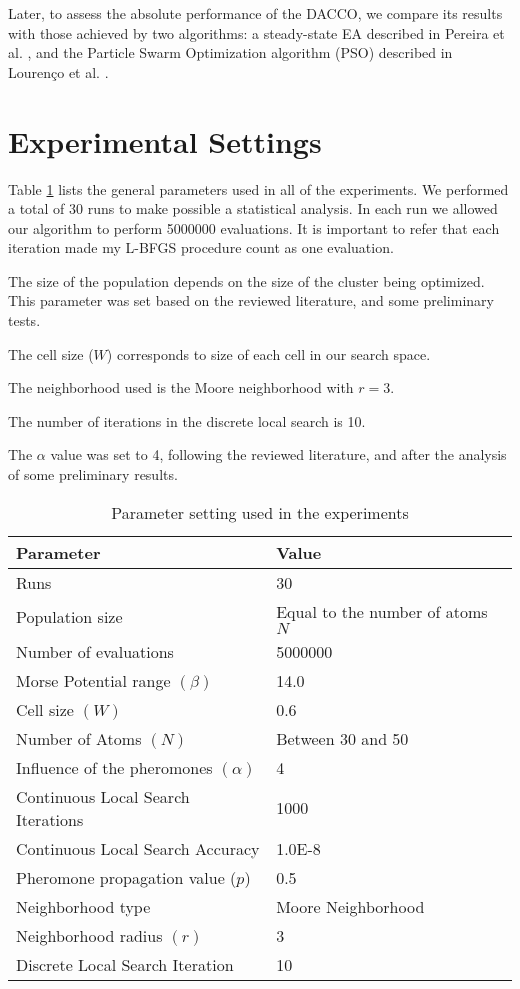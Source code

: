 	Later, to assess the absolute performance of the DACCO, we compare its results with those achieved by two algorithms: a steady-state EA described in Pereira et al. \cite{xico09}, and the Particle Swarm Optimization algorithm (PSO) described in Lourenço et al. \cite{lourenco11}.
	
\section{Experimental Settings}
\label{sec:experimental_setting}

Table \ref{tab:general_settings} lists the general parameters used in all of the experiments. We performed a total of 30 runs to make possible a statistical analysis. In each run we allowed our algorithm to perform 5000000 evaluations. It is important to refer that each iteration made my L-BFGS procedure count as one evaluation. 

The size of the population depends on the size of the cluster being optimized. This parameter was set based on the reviewed literature, and some preliminary tests. 

The cell size ($W$) corresponds to size of each cell in our search space. 

The neighborhood used is the Moore neighborhood with $r = 3$. 

The number of iterations in the discrete local search is 10.

The $\alpha$ value was set to 4, following the reviewed literature, and after the analysis of some preliminary results.

\begin{table}[!htbp]
	\begin{center}
		\begin{tabular}{| l | p{8cm} |}
			\hline
			\textbf{Parameter} & \textbf{Value} \\ \hline
			Runs & 30 \\
			Population size & Equal to the number of atoms $N$\\
			Number of evaluations & 5000000 \\
			Morse Potential range $(\beta)$ & 14.0 \\ 
			Cell size $(W)$ & 0.6 \\
			Number of Atoms $(N)$ & Between 30 and 50 \\
			Influence of the pheromones $(\alpha)$ & 4 \\
			Continuous Local Search Iterations & 1000\\
			Continuous Local Search Accuracy & 1.0E-8\\
			Pheromone propagation value ($p$) & 0.5 \\
			Neighborhood type & Moore Neighborhood \\
			Neighborhood radius $(r)$ & 3 \\
			Discrete Local Search Iteration & 10 \\
			\hline
		\end{tabular}
	\caption{Parameter setting used in the experiments}
	\label{tab:general_settings}
	\end{center}
\end{table}
\pagebreak

